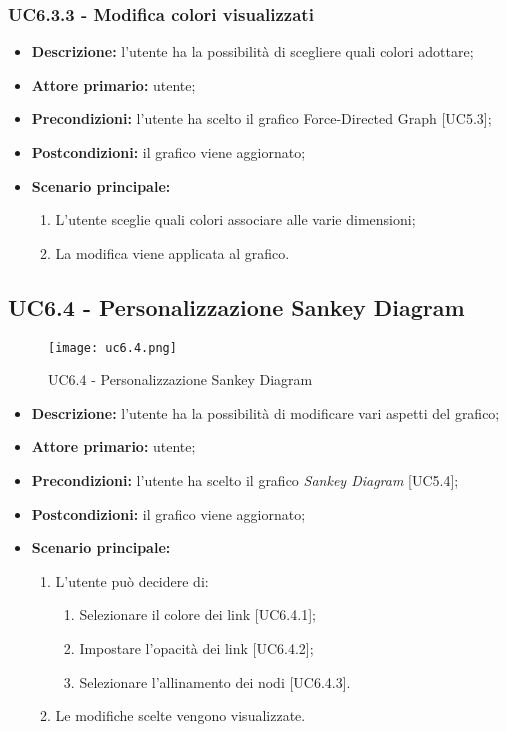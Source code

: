   \subsubsection{UC6.3.3 - Modifica colori visualizzati}
  \begin{itemize}
    \item \textbf{Descrizione:} l'utente ha la possibilità di scegliere quali colori adottare;
    \item \textbf{Attore primario:} utente;
    \item \textbf{Precondizioni:} l’utente ha scelto il grafico Force-Directed Graph [UC5.3];
    \item \textbf{Postcondizioni:} il grafico viene aggiornato;
    \item \textbf{Scenario principale:}
     \begin{enumerate}
      \item L'utente sceglie quali colori associare alle varie dimensioni;
      \item La modifica viene applicata al grafico.
    \end{enumerate}
  \end{itemize}

  \subsection{UC6.4 - Personalizzazione Sankey Diagram}
\begin{figure}[H]
  \centering
  \texttt{[image: uc6.4.png]}
  \caption{UC6.4 - Personalizzazione Sankey Diagram}
\end{figure}
\begin{itemize}
    \item \textbf{Descrizione:} l'utente ha la possibilità di modificare vari aspetti del grafico;
    \item \textbf{Attore primario:} utente;
    \item \textbf{Precondizioni:} l’utente ha scelto il grafico \textit{Sankey Diagram} [UC5.4];
    \item \textbf{Postcondizioni:} il grafico viene aggiornato;
    \item \textbf{Scenario principale:}
    \begin{enumerate}
      \item L'utente può decidere di:
    \begin{enumerate}
      \item Selezionare il colore dei link [UC6.4.1];
      \item Impostare l'opacità dei link [UC6.4.2];
      \item Selezionare l'allinamento dei nodi [UC6.4.3].
    \end{enumerate}
    \item Le modifiche scelte vengono visualizzate.
  \end{enumerate}
  \end{itemize}

